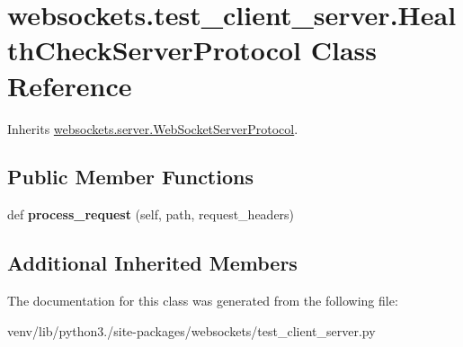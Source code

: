 \hypertarget{classwebsockets_1_1test__client__server_1_1_health_check_server_protocol}{}\section{websockets.\+test\+\_\+client\+\_\+server.\+Health\+Check\+Server\+Protocol Class Reference}
\label{classwebsockets_1_1test__client__server_1_1_health_check_server_protocol}


Inherits \hyperlink{classwebsockets_1_1server_1_1_web_socket_server_protocol}{websockets.\+server.\+Web\+Socket\+Server\+Protocol}.

\subsection*{Public Member Functions}
\begin{DoxyCompactItemize}
\item 
\mbox{\label{classwebsockets_1_1test__client__server_1_1_health_check_server_protocol_a8867ba2ee6dae5dc95e23a531b378fa4}} 
def {\bfseries process\+\_\+request} (self, path, request\+\_\+headers)
\end{DoxyCompactItemize}
\subsection*{Additional Inherited Members}


The documentation for this class was generated from the following file\+:\begin{DoxyCompactItemize}
\item 
venv/lib/python3./site-\/packages/websockets/test\+\_\+client\+\_\+server.\+py\end{DoxyCompactItemize}
